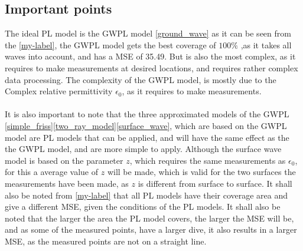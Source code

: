 \subsection{Important points}
The ideal PL model is the GWPL model \eqref{ground_wave} as it can be seen from the  \autoref{my-label}, the GWPL model gets the best coverage of $100\%$ ,as it takes all waves into account, and has a MSE of 35.49. But is also the most complex, as it requires to make measurements at desired locations, and requires rather complex data processing. The complexity of the GWPL model, is mostly due to the Complex relative permittivity $\epsilon_{0}$, as it requires to make measurements. 
\\
\\
It is also important to note that the three approximated models of the GWPL \eqref{simple_friss}\eqref{two_ray_model}\eqref{surface_wave}, which are based on the GWPL model are PL models that can be applied, and will have the same effect as the the GWPL model, and are more simple to apply. Although the surface wave model is based on the parameter $z$, which requires the same measurements as $\epsilon_{0}$, for this a average value of $z$ will be made, which is valid for the two surfaces the measurements have been made, as $z$ is different from surface to surface. It shall also be noted from \autoref{my-label} that all PL models have their coverage area and give a different MSE, given the conditions of the PL models. It shall also be noted that the larger the area the PL model covers, the larger the MSE will be, and as some of the measured points, have a larger dive, it also results in a larger MSE, as the measured points are not on a straight line. 



